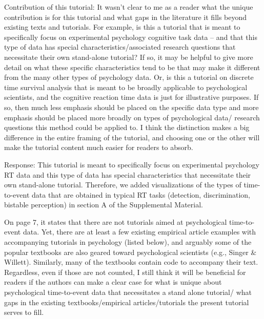 \documentclass[
]{article}
\renewenvironment{quote}{\begin{leftbar}}{\end{leftbar}}
\begin{document}
\begin{quote}
Contribution of this tutorial: It wasn't clear to me as a reader what
the unique contribution is for this tutorial and what gaps in the
literature it fills beyond existing texts and tutorials. For example, is
this a tutorial that is meant to specifically focus on experimental
psychology cognitive task data -- and that this type of data has special
characteristics/associated research questions that necessitate their own
stand-alone tutorial? If so, it may be helpful to give more detail on
what these specific characteristics tend to be that may make it
different from the many other types of psychology data. Or, is this a
tutorial on discrete time survival analysis that is meant to be broadly
applicable to psychological scientists, and the cognitive reaction time
data is just for illustrative purposes. If so, then much less emphasis
should be placed on the specific data type and more emphasis should be
placed more broadly on types of psychological data/ research questions
this method could be applied to. I think the distinction makes a big
difference in the entire framing of the tutorial, and choosing one or
the other will make the tutorial content much easier for readers to
absorb.
\end{quote}

Response: This tutorial is meant to specifically focus on experimental
psychology RT data and this type of data has special characteristics
that necessitate their own stand-alone tutorial. Therefore, we added
visualizations of the types of time-to-event data that are obtained in
typical RT tasks (detection, discrimination, bistable perception) in
section A of the Supplemental Material.

\begin{quote}
On page 7, it states that there are not tutorials aimed at psychological
time-to-event data. Yet, there are at least a few existing empirical
article examples with accompanying tutorials in psychology (listed
below), and arguably some of the popular textbooks are also geared
toward psychological scientists (e.g., Singer \& Willett). Similarly,
many of the textbooks contain code to accompany their text. Regardless,
even if those are not counted, I still think it will be beneficial for
readers if the authors can make a clear case for what is unique about
psychological time-to-event data that necessitates a stand alone
tutorial/ what gaps in the existing textbooks/empirical
articles/tutorials the present tutorial serves to fill.
\end{quote}
\end{document}

